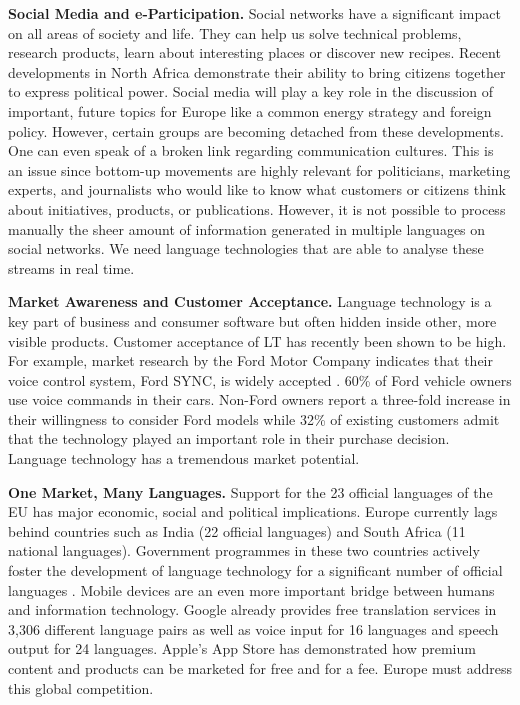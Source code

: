 \documentclass[10pt, plain]{../../metanetpaper}
\begin{document}
\begin{multicols}{2}
\textbf{Social Media and e-Participation.} Social networks have a significant impact on all areas of society and life. They can help us solve technical problems, research products, learn about interesting places or discover new recipes. Recent developments in North Africa demonstrate their ability to bring citizens together to express political power. Social media will play a key role in the discussion of important, future topics for Europe like a common energy strategy and foreign policy. However, certain groups are becoming detached from these developments. One can even speak of a broken link regarding communication cultures. This is an issue since bottom-up movements are highly relevant for politicians, marketing experts, and journalists who would like to know what customers or citizens think about initiatives, products, or publications. However, it is not possible to process manually the sheer amount of information generated in multiple languages on social networks. We need language technologies that are able to analyse these streams in real time.

\textbf{Market Awareness and Customer Acceptance.} Language technology is a key part of business and consumer software but often hidden inside other, more visible products. Customer acceptance of LT has recently been shown to be high. For example, market research by the Ford Motor Company indicates that their voice control system, Ford SYNC, is widely accepted \cite{ford}. 60\% of Ford vehicle owners use voice commands in their cars. Non-Ford owners report a three-fold increase in their willingness to consider Ford models while 32\% of existing customers admit that the technology played an important role in their purchase decision. Language technology has a tremendous market potential.

\textbf{One Market, Many Languages.} Support for the 23 official languages of the EU has major economic, social and political implications. Europe currently lags behind countries such as India (22 official languages) and South Africa (11 national languages). Government programmes in these two countries actively foster the development of language technology for a significant number of official languages \cite{india2012,sa2012}. Mobile devices are an even more important bridge between humans and information technology. Google already provides free translation services in 3,306 different language pairs as well as voice input for 16 languages and speech output for 24 languages. Apple's App Store has demonstrated how premium content and products can be marketed for free and for a fee. Europe must address this global competition.


\end{multicols}
\end{document}
